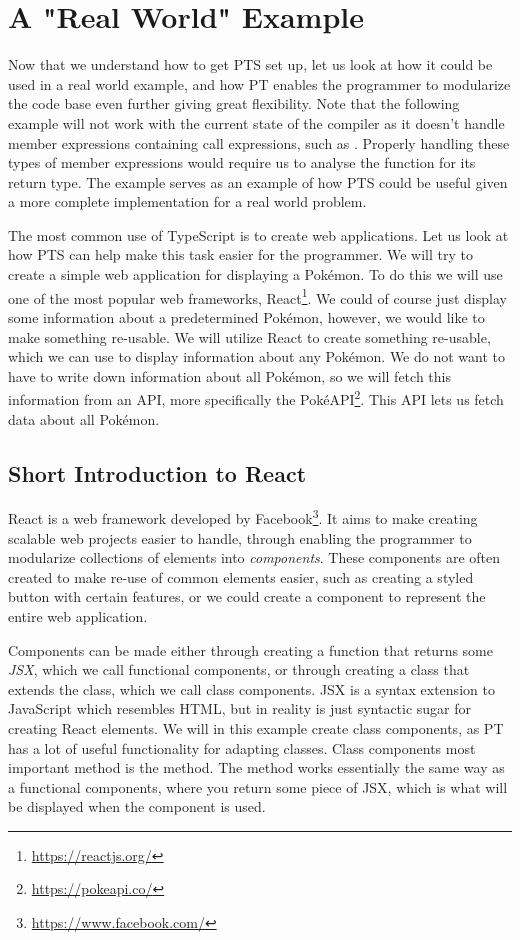 \section{A "Real World" Example}\label{sec:a-real-world-example}

Now that we understand how to get PTS set up, let us look at how it could be used in a real world example, and how PT enables the programmer to modularize the code base even further giving great flexibility.
Note that the following example will not work with the current state of the compiler as it doesn't handle member expressions containing call expressions, such as .
Properly handling these types of member expressions would require us to analyse the function for its return type.
The example serves as an example of how PTS could be useful given a more complete implementation for a real world problem.

The most common use of TypeScript is to create web applications.
Let us look at how PTS can help make this task easier for the programmer.
We will try to create a simple web application for displaying a Pokémon.
To do this we will use one of the most popular web frameworks, React\footnote{\url{https://reactjs.org/}}.
We could of course just display some information about a predetermined Pokémon, however, we would like to make something re-usable.
We will utilize React to create something re-usable, which we can use to display information about any Pokémon.
We do not want to have to write down information about all Pokémon, so we will fetch this information from an API, more specifically the PokéAPI\footnote{\url{https://pokeapi.co/}}.
This API lets us fetch data about all Pokémon.

\subsection{Short Introduction to React}\label{subsec:short-introduction-to-react}

React is a web framework developed by Facebook\footnote{\url{https://www.facebook.com/}}.
It aims to make creating scalable web projects easier to handle, through enabling the programmer to modularize collections of elements into \emph{components}.
These components are often created to make re-use of common elements easier, such as creating a styled button with certain features, or we could create a component to represent the entire web application.

Components can be made either through creating a function that returns some \emph{JSX}, which we call functional components, or through creating a class that extends the  class, which we call class components.
JSX is a syntax extension to JavaScript which resembles HTML, but in reality is just syntactic sugar for creating React elements.
We will in this example create class components, as PT has a lot of useful functionality for adapting classes.
Class components most important method is the  method.
The  method works essentially the same way as a functional components, where you return some piece of JSX, which is what will be displayed when the component is used.

